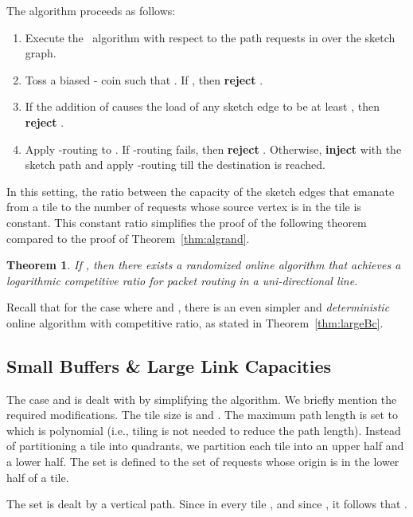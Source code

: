 \documentclass[11pt]{article}
\newtheorem{theorem}{Theorem}
\newcommand{\route}{\text{\sc{ipp}}}
\newenvironment{proof sketch}[1]{\noindent {\emph{Proof sketch of #1:}}}{\hfill \qed}
\begin{document}
The algorithm proceeds as follows:
\begin{enumerate}
\item Execute the \route\ algorithm with respect to the path requests in  over
  the sketch graph.

\item \label{line:toss 2} Toss a biased - coin  such that . If , then \textbf{reject} .

\item
\label{line:load 2}\label{item:quarter 2}
If the addition of  causes the load of any sketch edge to be at least
, then \textbf{reject} .

\item\label{line:I 2} Apply -routing to .  If -routing fails, then
  \textbf{reject} . Otherwise, \textbf{inject}  with the sketch path  and apply -routing till the destination is reached.
\end{enumerate}

In this setting, the ratio between the capacity of the sketch edges that emanate from
a tile to the number of requests whose source vertex is in the tile is constant. This
constant ratio simplifies the proof of the following theorem compared to the proof of
Theorem~\ref{thm:algrand}.

\begin{theorem}
  If , then there exists a randomized online algorithm
  that achieves a logarithmic competitive ratio for packet routing in a
  uni-directional line.
\end{theorem}

Recall that for the case where  and , there is an even simpler
and \emph{deterministic} online algorithm with 
competitive ratio, as stated in Theorem~\ref{thm:largeBc}.

\subsection{Small Buffers \& Large Link Capacities}\label{sec:smallBlargec}
The case  and  is dealt with
by simplifying the algorithm. We briefly mention the required
modifications. The tile size is  and .  The maximum
path length is set to  which is polynomial (i.e.,
tiling is not needed to reduce the path length).  Instead of
partitioning a tile into quadrants, we partition each tile into an
upper half and a lower half. The set  is defined to the set of
requests whose origin is in the lower half of a tile.

The set  is dealt by a vertical path. Since in every
tile ,  and
since , it follows that .
\end{document}
